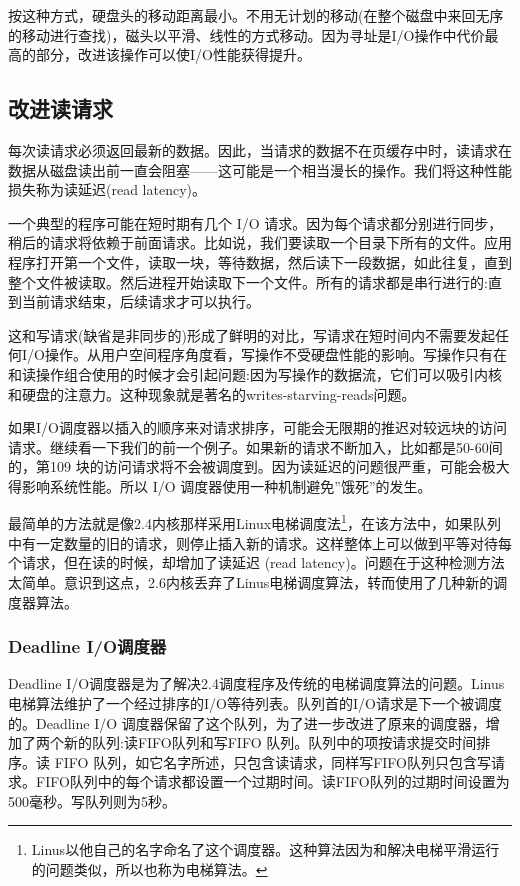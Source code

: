 按这种方式，硬盘头的移动距离最小。不用无计划的移动(在整个磁盘中来回无序的移动进行查找)，磁头以平滑、线性的方式移动。因为寻址是I/O操作中代价最高的部分，改进该操作可以使I/O性能获得提升。

\subsection{改进读请求}

每次读请求必须返回最新的数据。因此，当请求的数据不在页缓存中时，读请求在数据从磁盘读出前一直会阻塞——这可能是一个相当漫长的操作。我们将这种性能损失称为读延迟(read latency)。

一个典型的程序可能在短时期有几个 I/O 请求。因为每个请求都分别进行同步，稍后的请求将依赖于前面请求。比如说，我们要读取一个目录下所有的文件。应用程序打开第一个文件，读取一块，等待数据，然后读下一段数据，如此往复，直到整个文件被读取。然后进程开始读取下一个文件。所有的请求都是串行进行的:直到当前请求结束，后续请求才可以执行。

这和写请求(缺省是非同步的)形成了鲜明的对比，写请求在短时间内不需要发起任何I/O操作。从用户空间程序角度看，写操作不受硬盘性能的影响。写操作只有在和读操作组合使用的时候才会引起问题:因为写操作的数据流，它们可以吸引内核和硬盘的注意力。这种现象就是著名的writes-starving-reads问题。

如果I/O调度器以插入的顺序来对请求排序，可能会无限期的推迟对较远块的访问请求。继续看一下我们的前一个例子。如果新的请求不断加入，比如都是50-60间的，第109 块的访问请求将不会被调度到。因为读延迟的问题很严重，可能会极大得影响系统性能。所以 I/O 调度器使用一种机制避免''饿死''的发生。

最简单的方法就是像2.4内核那样采用Linux电梯调度法\footnote[1]{Linus以他自己的名字命名了这个调度器。这种算法因为和解决电梯平滑运行的问题类似，所以也称为电梯算法。}，在该方法中，如果队列中有一定数量的旧的请求，则停止插入新的请求。这样整体上可以做到平等对待每个请求，但在读的时候，却增加了读延迟 (read latency)。问题在于这种检测方法太简单。意识到这点，2.6内核丢弃了Linus电梯调度算法，转而使用了几种新的调度器算法。

\subsubsection{Deadline I/O调度器}

Deadline I/O调度器是为了解决2.4调度程序及传统的电梯调度算法的问题。Linus电梯算法维护了一个经过排序的I/O等待列表。队列首的I/O请求是下一个被调度的。Deadline I/O 调度器保留了这个队列，为了进一步改进了原来的调度器，增加了两个新的队列:读FIFO队列和写FIFO 队列。队列中的项按请求提交时间排序。读 FIFO 队列，如它名字所述，只包含读请求，同样写FIFO队列只包含写请求。FIFO队列中的每个请求都设置一个过期时间。读FIFO队列的过期时间设置为500毫秒。写队列则为5秒。

